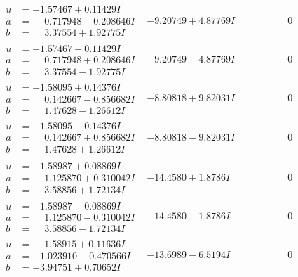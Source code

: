 \documentclass[1p]{elsarticle_modified}
\theoremstyle{definition}
\begin{document}
$$\begin{array}{c|c|c}
\begin{aligned}
u &= -1.57467 + 0.11429 I \\
a &= \phantom{-}0.717948 - 0.208646 I \\
b &= \phantom{-}3.37554 + 1.92775 I\end{aligned}
 & -9.20749 + 4.87769 I & \phantom{-0.000000 } 0 \\ \hline\begin{aligned}
u &= -1.57467 - 0.11429 I \\
a &= \phantom{-}0.717948 + 0.208646 I \\
b &= \phantom{-}3.37554 - 1.92775 I\end{aligned}
 & -9.20749 - 4.87769 I & \phantom{-0.000000 } 0 \\ \hline\begin{aligned}
u &= -1.58095 + 0.14376 I \\
a &= \phantom{-}0.142667 - 0.856682 I \\
b &= \phantom{-}1.47628 - 1.26612 I\end{aligned}
 & -8.80818 + 9.82031 I & \phantom{-0.000000 } 0 \\ \hline\begin{aligned}
u &= -1.58095 - 0.14376 I \\
a &= \phantom{-}0.142667 + 0.856682 I \\
b &= \phantom{-}1.47628 + 1.26612 I\end{aligned}
 & -8.80818 - 9.82031 I & \phantom{-0.000000 } 0 \\ \hline\begin{aligned}
u &= -1.58987 + 0.08869 I \\
a &= \phantom{-}1.125870 + 0.310042 I \\
b &= \phantom{-}3.58856 + 1.72134 I\end{aligned}
 & -14.4580 + 1.8786 I & \phantom{-0.000000 } 0 \\ \hline\begin{aligned}
u &= -1.58987 - 0.08869 I \\
a &= \phantom{-}1.125870 - 0.310042 I \\
b &= \phantom{-}3.58856 - 1.72134 I\end{aligned}
 & -14.4580 - 1.8786 I & \phantom{-0.000000 } 0 \\ \hline\begin{aligned}
u &= \phantom{-}1.58915 + 0.11636 I \\
a &= -1.023910 - 0.470566 I \\
b &= -3.94751 + 0.70652 I\end{aligned}
 & -13.6989 - 6.5194 I & \phantom{-0.000000 } 0\\

\end{array}$$
\end{document}
